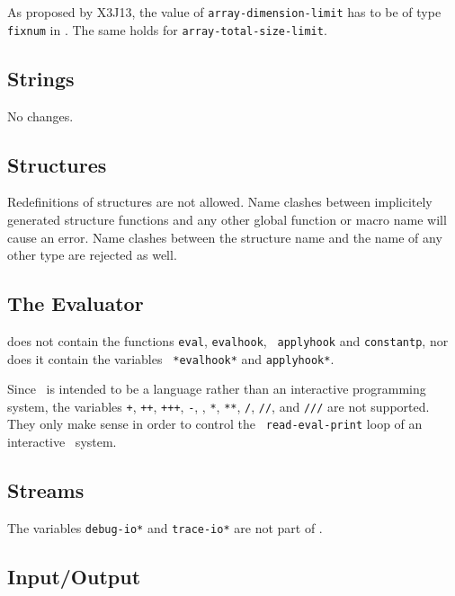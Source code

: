 As proposed by X3J13, the value of {\tt array-dimension-limit} has to be of 
type {\tt fixnum} in . The same holds for {\tt array-total-size-limit}.

\subsection{Strings}
\label{strings}

No changes.

\subsection{Structures}

Redefinitions of structures are not allowed. Name clashes between 
implicitely generated structure functions and any other global function or 
macro name will cause an error. Name clashes between the structure name and 
the name of any other type are rejected as well.

\subsection{The Evaluator}

 does not contain the functions {\tt eval}, {\tt evalhook}, {\tt 
applyhook} and {\tt constantp}, nor does it contain the variables {\tt 
*evalhook*} and {\tt *applyhook*}. 

Since \ is intended to be a language rather than an interactive 
programming system, the variables {\tt +}, {\tt ++}, {\tt +++}, {\tt -}, 
{\tt *}, {\tt **}, {\tt ***}, {\tt /}, {\tt //}, and {\tt ///} are not 
supported. They only make sense in order to control the {\tt 
read-eval-print} loop of an interactive \CL\ system.

\subsection{Streams}

The variables {\tt *debug-io*} and {\tt *trace-io*} are not part of .

\subsection{Input/Output}
\label{io}

